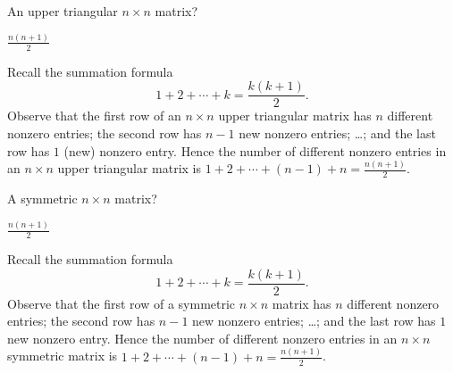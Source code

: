 \documentclass{ximera}
\begin{document}
\begin{exercise}  \label{c1.3.3b}
An upper triangular $n\times n$ matrix? 

\begin{solution}

\ans  $\frac{n(n + 1)}{2}$

\soln  Recall the summation formula
    \[
      1 + 2 + \cdots + k = \frac{k(k+1)}{2}.
    \]
Observe that the first row of an $n\times n$ upper triangular matrix has $n$ different nonzero entries; the second row has $n-1$ new nonzero entries; \ldots; and the last row has $1$ (new) nonzero entry.  Hence the number of different nonzero entries in an $n\times n$ upper triangular matrix is
$1 + 2 + \cdots + (n-1) + n = \frac{n(n + 1)}{2}$.

\end{solution}
\end{exercise}

\begin{exercise}  \label{c1.3.3c}
A symmetric $n\times n$ matrix?   


\begin{solution}
\ans  $\frac{n(n + 1)}{2}$

\soln  Recall the summation formula
    \[
      1 + 2 + \cdots + k = \frac{k(k+1)}{2}.
    \]
Observe that the first row of a symmetric $n\times n$ matrix has $n$ different nonzero entries; the second row has $n-1$ new nonzero entries; \ldots; and the last row has $1$ new nonzero entry.  Hence the number of different nonzero entries in an $n\times n$ symmetric matrix is
$1 + 2 + \cdots + (n-1) + n = \frac{n(n + 1)}{2}$.


\end{solution}
\end{exercise}
\end{document}
